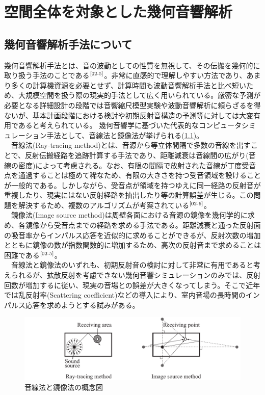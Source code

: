 \chapter{空間全体を対象とした幾何音響解析}

\section{幾何音響解析手法について}
幾何音響解析手法とは、音の波動としての性質を無視して、その伝搬を幾何的に取り扱う手法のことである$^{\text{\cite{02-5}}}$。非常に直感的で理解しやすい方法であり、あまり多くの計算機資源を必要とせず、計算時間も波動音響解析手法と比べ短いため、大規模空間を扱う際の現実的手法として広く用いられている。厳密な予測が必要となる詳細設計の段階では音響縮尺模型実験や波動音響解析に頼らざるを得ないが、基本計画段階における検討や初期反射音構造の予測等に対しては大変有用であると考えられている。
幾何音響学に基づいた代表的なコンピュータシミュレーション手法として、音線法と鏡像法が挙げられる(\ref{fig:音線法と鏡像法})。
\\　音線法(Ray-tracing method)とは、音源から等立体間隔で多数の音線を出すことで、反射伝搬経路を追跡計算する手法であり、距離減衰は音線間の広がり(音線の密度)によって考慮される。なお、有限の間隔で放射された音線が丁度受音点を通過することは極めて稀なため、有限の大きさを持つ受音領域を設けることが一般的である。しかしながら、受音点が領域を持つゆえに同一経路の反射音が重複したり、現実にはない反射経路を抽出したり等の計算誤差が生じる。この問題を解決するため、複数のアルゴリズムが考案されている$^{\text{\cite{02-6}}}$。
\\　鏡像法(Image source method)は周壁各面における音源の鏡像を幾何学的に求め、各鏡像から受音点までの経路を求める手法である。距離減衰と通った反射面の吸音率からインパルス応答を近似的に求めることができるが、反射次数の増加とともに鏡像の数が指数関数的に増加するため、高次の反射音まで求めることは困難である$^{\text{\cite{02-5}}}$。
\\　音線法と鏡像法のいずれも、初期反射音の検討に対して非常に有用であると考えられるが、拡散反射を考慮できない幾何音響シミュレーションのみでは、反射回数が増加するに従い、現実の音場との誤差が大きくなってしまう。そこで近年では乱反射率(Scattering coefficient)などの導入により、室内音場の長時間のインパルス応答を求めようとする試みがある。

\begin{figure}[H]
    \centering
    \includegraphics[keepaspectratio,scale=0.8]{02_att/kikaonkyo.pdf}
    \caption{\hspace{1mm}音線法と鏡像法の概念図}
    \label{fig:音線法と鏡像法}
\end{figure}

